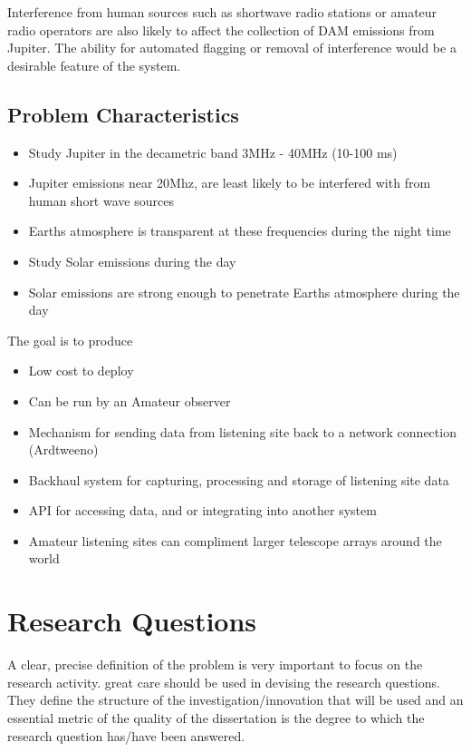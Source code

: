 \documentclass[runningheads,a4paper]{llncs}
\begin{document}
Interference from human sources such as shortwave radio stations or amateur radio operators are also likely to affect the collection of \gls{DAM} emissions from Jupiter. The ability for automated flagging or removal of interference would be a desirable feature of the system.


\subsection*{Problem Characteristics}

\begin{itemize}
  \item Study Jupiter in the decametric band 3MHz - 40MHz (10-100 ms)
  \item Jupiter emissions near 20Mhz, are least likely to be interfered with from human short wave sources
  \item Earths atmosphere is transparent at these frequencies during the night time
  \item Study Solar emissions during the day
  \item Solar emissions are strong enough to penetrate Earths atmosphere during the day
\end{itemize}

The goal is to produce

\begin{itemize}
  \item Low cost to deploy
  \item Can be run by an Amateur observer
  \item Mechanism for sending data from listening site back to a network connection (Ardtweeno)
  \item Backhaul system for capturing, processing and storage of listening site data
  \item API for accessing data, and or integrating into another system
  \item Amateur listening sites can compliment larger telescope arrays around the world
\end{itemize}


%
%
\newpage
\section*{Research Questions}
A clear, precise definition of the problem is very important to focus on the research activity. great care should be used in devising the research questions. They define the structure of the investigation/innovation that will be used and an essential metric of the quality of the dissertation is the degree to which the research question has/have been answered.
\end{document}
